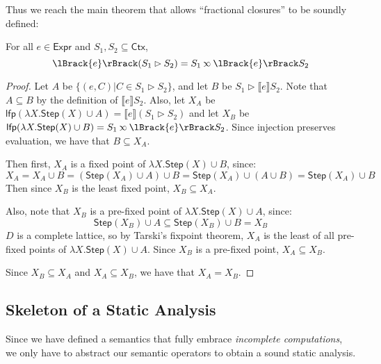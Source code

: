 \documentclass[acmsmall,screen,review]{acmart}\settopmatter{printfolios=true,printccs=false,printacmref=false}
\newcommand*{\Expr}{\mathsf{Expr}}
\newcommand*{\Ctx}{\mathsf{Ctx}}
\newcommand*{\lfp}{\mathsf{lfp}}
\newcommand*{\Step}{\mathsf{Step}}
\newcommand*{\semlink}{\mathbin{\rotatebox[origin=c]{180}{$\propto$}}}
\newcommand*{\sembracket}[1]{\lBrack{#1}\rBrack}
\begin{document}
Thus we reach the main theorem that allows ``fractional closures'' to be soundly defined:
\begin{theorem}[Advance]
  For all $e\in\Expr$ and $S_1,S_2\subseteq\Ctx$,
  \[\sembracket{e}(S_1\rhd S_2)=S_1\semlink\sembracket{e}S_2\]
\end{theorem}
\begin{proof}
  Let $A$ be $\{(e,C)|C\in S_1\rhd S_2\}$, and let $B$ be $S_1\rhd\sembracket{e}S_2$.
  Note that $A\subseteq B$ by the definition of $\sembracket{e}S_2$.
  Also, let $X_A$ be $\lfp(\lambda X.\Step(X)\cup A)=\sembracket{e}(S_1\rhd S_2)$ and let $X_B$ be $\lfp(\lambda X.\Step(X)\cup B)=S_1\semlink\sembracket{e}S_2$.
  Since injection preserves evaluation, we have that $B\subseteq X_A$.

  Then first, $X_A$ is a fixed point of $\lambda X.\Step(X)\cup B$, since:
  \[X_A=X_A\cup B=(\Step(X_A)\cup A)\cup B=\Step(X_A)\cup(A\cup B)=\Step(X_A)\cup B\]
  Then since $X_B$ is the least fixed point, $X_B\subseteq X_A$.

  Also, note that $X_B$ is a pre-fixed point of $\lambda X.\Step(X)\cup A$, since:
  \[\Step(X_B)\cup A\subseteq\Step(X_B)\cup B=X_B\]
  $D$ is a complete lattice, so by Tarski's fixpoint theorem, $X_A$ is the least of all pre-fixed points of $\lambda X.\Step(X)\cup A$.
  Since $X_B$ is a pre-fixed point, $X_A\subseteq X_B$.

  Since $X_B\subseteq X_A$ and $X_A\subseteq X_B$, we have that $X_A=X_B$.
\end{proof}

\subsection{Skeleton of a Static Analysis}
Since we have defined a semantics that fully embrace \emph{incomplete computations}, we only have to abstract our semantic operators to obtain a sound static analysis.
\end{document}
